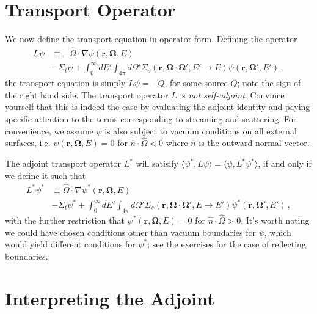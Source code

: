 \section*{Transport Operator}
We now define the transport equation in operator form.  Defining the operator 
\begin{equation}
  \begin{split}
     L\psi & \equiv -\hat{\Omega} \cdot \nabla \psi(\mathbf{r},\mathbf{\Omega},E) \\
           & -\Sigma_t \psi + \int^{\infty}_{0} dE' \int_{4\pi} d\Omega' \Sigma_s(\mathbf{r},\mathbf{\Omega}\cdot\mathbf{\Omega}',E'\to E)\psi(\mathbf{r},\mathbf{\Omega'},E') \, ,
  \end{split}
  \label{eq:transportoperator}
\end{equation}
the transport equation is simply $L \psi = -Q$, for some source $Q$; note the sign of the right hand side.  The transport operator $L$ is \textit{not self-adjoint}.  Convince yourself that this is indeed the case by evaluating the adjoint identity and paying specific attention to the terms corresponding to streaming and scattering.  For convenience, we assume $\psi$ is also subject to vacuum conditions on all external surfaces, i.e. $\psi(\mathbf{r},\mathbf{\Omega},E)=0$ for $\hat{n}\cdot \hat{\Omega} < 0$ where $\hat{n}$ is the outward normal vector.

The adjoint transport operator $L^*$ will satisify $\langle \psi^*, L \psi \rangle =  \langle \psi, L^* \psi^* \rangle $, if and only if we define it such that
\begin{equation}
  \begin{split}
     L^*\psi^* & \equiv \hat{\Omega} \cdot \nabla \psi^*(\mathbf{r},\mathbf{\Omega},E) \\
               & -\Sigma_t \psi^* + \int^{\infty}_{0} dE' \int_{4\pi} d\Omega' \Sigma_s(\mathbf{r},\mathbf{\Omega}\cdot\mathbf{\Omega}',E\to E')\psi^*(\mathbf{r},\mathbf{\Omega'},E') \, ,
   \end{split}
   \label{eq:adjointoperator}
\end{equation}
with the further restriction that $\psi^*(\mathbf{r},\mathbf{\Omega},E)=0$ for $\hat{n}\cdot \hat{\Omega} > 0$. It's worth noting we could have chosen conditions other than vacuum boundaries for $\psi$, which would yield different conditions for $\psi^*$; see the exercises for the case of reflecting boundaries.

\section*{Interpreting the Adjoint}

